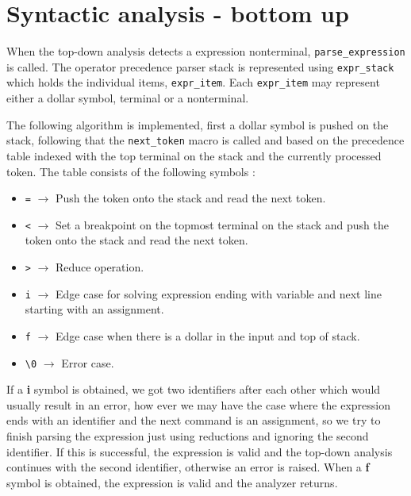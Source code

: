 \documentclass[11pt]{article}
\begin{document}
\restoregeometry






\section{Syntactic analysis - bottom up}

When the top-down analysis detects a expression nonterminal, \texttt{parse\_expression} is called. The operator precedence parser stack is represented using \texttt{expr\_stack} which holds the individual items, \texttt{expr\_item}. Each \texttt{expr\_item} may represent either a dollar symbol, terminal or a nonterminal.

The following algorithm is implemented, first a dollar symbol is pushed on the stack, following that the \texttt{next\_token} macro is called and based on the precedence table indexed with the top terminal on the stack and the currently processed token. The table consists of the following symbols :
\begin{itemize}
\item \texttt{=} $\rightarrow$ Push the token onto the stack and read the next token.
\item \texttt{<} $\rightarrow$  Set a breakpoint on the topmost terminal on the stack and push the token onto the stack and read the next token.
\item \texttt{>} $\rightarrow$  Reduce operation.
\item \texttt{i} $\rightarrow$  Edge case for solving expression ending with variable and next line starting with an assignment.
\item \texttt{f} $\rightarrow$  Edge case when there is a dollar in the input and top of stack.
\item \texttt{\textbackslash 0} $\rightarrow$  Error case.
\end{itemize}

If a \textbf{i} symbol is obtained, we got two identifiers after each other which would usually result in an error, how ever we may have the case where the expression ends with an identifier and the next command is an assignment, so we try to finish parsing the expression just using reductions and ignoring the second identifier. If this is successful, the expression is valid and the top-down analysis continues with the second identifier, otherwise an error is raised.
When a \textbf{f} symbol is obtained, the expression is valid and the analyzer returns.
\end{document}
